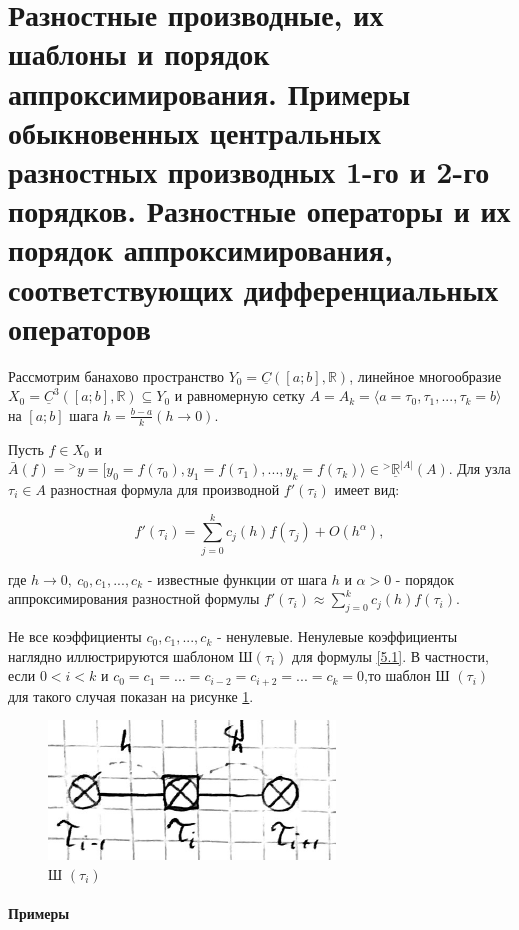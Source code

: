 \documentclass[__main__.tex]{subfiles}
\begin{document}
\section{Разностные производные, их шаблоны и порядок аппроксимирования. Примеры обыкновенных центральных разностных производных 1-го и 2-го порядков. Разностные операторы и их порядок аппроксимирования, соответствующих дифференциальных операторов}

Рассмотрим банахово пространство $Y_0 = \underline{C} \left( \left[ a; b \right], \mathbb{R} \right)$, линейное многообразие $X_0 = \underline{C}^3 \left( \left[ a; b \right], \mathbb{R} \right) \subseteq Y_0$ и равномерную сетку $A = A_k = \langle a = \tau_0, \tau_1, ..., \tau_k = b \rangle$ на $\left[ a; b\right]$ шага $h = \frac{b-a}{k} \left( h \rightarrow 0 \right)$.

Пусть $f \in X_0$ и $\bar{A} \left( f \right) = {}^> y =  [ y_0 = f \left( \tau_0 \right), y_1 = f \left( \tau_1 \right), ..., y_k = f \left( \tau_k \right) \rangle \in {}^> \underline{\mathbb{R}}^{\left| A \right|} \left( A \right)$. Для узла $\tau_i \in A$ разностная формула для производной $f' \left( \tau_i \right)$ имеет вид:

\begin{equation} \label{5.1}
f' \left( \tau_i \right) = \sum_{j=0}^{k} c_j \left( h \right) f\left( \tau_j \right) + O \left( h^\alpha \right),
\end{equation}

где $h \rightarrow 0, \ c_0, c_1, ..., c_k$ - известные функции от шага $h$ и $\alpha > 0$ - порядок аппроксимирования разностной формулы $f' \left( \tau_i \right) \approx \sum_{j=0}^{k} c_j \left( h \right) f \left( \tau_i \right)$.

Не все коэффициенты $c_0, c_1, ..., c_k$ - ненулевые. Ненулевые коэффициенты наглядно иллюстрируются шаблоном Ш$\left(\tau_i\right)$ для формулы \ref{5.1}. В частности, если $0<i<k$ и $c_0 = c_1 = ... = c_{i-2} = c_{i+2} = ... = c_k = 0$,то шаблон Ш $\left( \tau_i \right)$ для такого случая показан на рисунке \ref{img_5.1}.

\begin{figure}[h!]
	\centering
	\includegraphics[width=0.08\linewidth]{img/img_5.1}
	\caption{Ш $\left( \tau_i \right)$}
	\label{img_5.1}
\end{figure}

\paragraph{Примеры}
\end{document}
